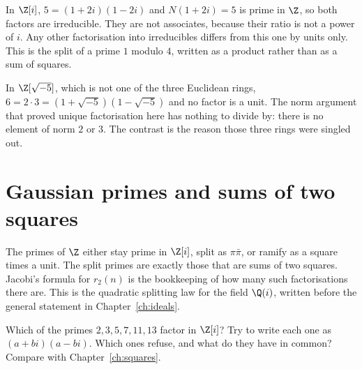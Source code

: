\begin{examplex}
In $\Z[i]$, $5=(1+2i)(1-2i)$ and $N(1+2i)=5$ is prime in $\Z$, so both factors are irreducible. They are not associates, because their ratio is not a power of $i$. Any other factorisation into irreducibles differs from this one by units only. This is the split of a prime $1$ modulo $4$, written as a product rather than as a sum of squares.
\end{examplex}

\begin{examplex}
In $\Z[\sqrt{-5}]$, which is not one of the three Euclidean rings, $6=2\cdot 3=(1+\sqrt{-5})(1-\sqrt{-5})$ and no factor is a unit. The norm argument that proved unique factorisation here has nothing to divide by: there is no element of norm $2$ or $3$. The contrast is the reason those three rings were singled out.
\end{examplex}

\section{Gaussian primes and sums of two squares}

The primes of $\Z$ either stay prime in $\Z[i]$, split as $\pi\bar\pi$, or ramify as a square times a unit. The split primes are exactly those that are sums of two squares. Jacobi's formula for $r_2(n)$ is the bookkeeping of how many such factorisations there are. This is the quadratic splitting law for the field $\Q(i)$, written before the general statement in Chapter~\ref{ch:ideals}.

\begin{think}
Which of the primes $2,3,5,7,11,13$ factor in $\Z[i]$? Try to write each one as $(a+bi)(a-bi)$. Which ones refuse, and what do they have in common? Compare with Chapter~\ref{ch:squares}.
\end{think}

